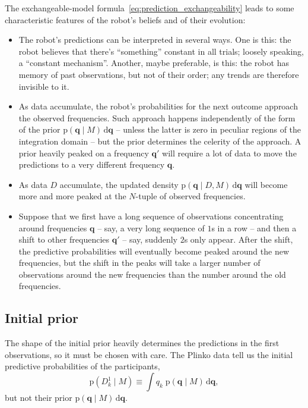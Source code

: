 \documentclass[\ifafour a4paper,12pt,\else a5paper,10pt,\fi%
onecolumn,oneside,article,%
british%
]{memoir}
\theoremstyle{remark}
\theoremstyle{innote}
\newcommand*{\di}{\mathrm{d}}%
\newcommand*{\pf}{\mathrm{p}}%
\renewcommand*{\|}{\mathpunct{|}}
\newcommand*{\yqq}{q}
\newcommand*{\yq}{\bm{\yqq}}
\begin{document}
The exchangeable-model formula~\eqref{eq:prediction_exchangeability} leads
to some characteristic features of the robot's beliefs and of their
evolution:
\begin{itemize}
\item The robot's predictions can be interpreted in several ways. One is
  this: the robot believes that there's \enquote{something} constant in all
  trials; loosely speaking, a \enquote{constant mechanism}. Another, maybe
  preferable, is this: the robot has memory of past observations, but not
  of their order; any trends are therefore invisible to it.
\item As data accumulate, the robot's probabilities for the next outcome
  approach the observed frequencies. Such approach happens independently of
  the form of the prior $\pf(\yq \| M)\,\di\yq$ -- unless the latter is
  zero in peculiar regions of the integration domain -- but the prior
  determines the celerity of the approach. A prior heavily peaked on a
  frequency $\yq'$ will require a lot of data to move the predictions to
  a very different frequency $\yq$.
\item As data $D$ accumulate, the updated density
  $\pf(\yq \| D, M)\,\di\yq$ will become more and more peaked at the
  $N$-tuple of observed frequencies.
\item Suppose that we first have a long sequence of observations
  concentrating around frequencies $\yq$ -- say, a very long sequence of
  $1$s in a row -- and then a shift to other frequencies $\yq'$ -- say,
  suddenly $2$s only appear. After the shift, the predictive probabilities
  will eventually become peaked around the new frequencies, but the shift
  in the peaks will take a larger number of observations around the new
  frequencies than the number around the old frequencies.
\end{itemize}


\subsection{Initial prior}
\label{sec:initial_prior}

The shape of the initial prior heavily determines the predictions in the
first observations, so it must be chosen with care. The Plinko data tell us
the initial predictive probabilities of the participants,
\begin{equation}
  \label{eq:initial_predictive}
  \pf(D^1_{k} \| M) \equiv \int \yqq_{k}\; \pf(\yq \| M)\,\di\yq,
\end{equation}
but not their prior $\pf(\yq \| M)\,\di\yq$.
\end{document}
